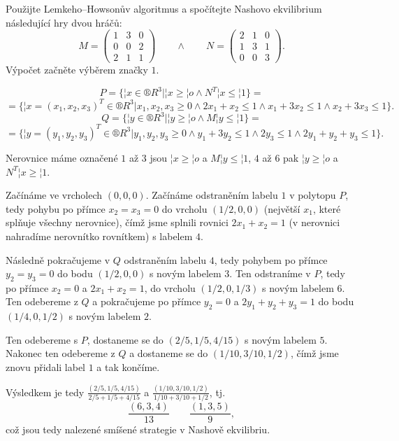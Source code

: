 \documentclass[12pt]{article}					%
\begin{document}
\begin{priklad}[2.2]
	Použijte Lemkeho–Howsonův algoritmus a spočítejte Nashovo ekvilibrium následující hry dvou hráčů:
	$$ M = \begin{pmatrix} 1 & 3 & 0 \\ 0 & 0 & 2 \\ 2 & 1 & 1 \end{pmatrix} \qquad \land \qquad N = \begin{pmatrix} 2 & 1 & 0 \\ 1 & 3 & 1 \\ 0 & 0 & 3 \end{pmatrix}. $$
	Výpočet začněte výběrem značky $1$.

	\begin{reseni}
		$$ P = \{¦x \in ®R^3 | ¦x ≥ ¦o \land N^T ¦x ≤ ¦1\} = $$
		$$ = \{¦x = (x_1, x_2, x_3)^T \in ®R^3 | x_1,x_2,x_3 ≥ 0 \land 2x_1 + x_2 ≤ 1 \land x_1 + 3x_2 ≤ 1 \land x_2 + 3x_3 ≤ 1\}. $$
		$$ Q = \{¦y \in ®R^3 | ¦y ≥ ¦o \land M ¦y ≤ ¦1\} = $$
		$$ = \{¦y = (y_1, y_2, y_3)^T \in ®R^3 | y_1,y_2,y_3 ≥ 0 \land y_1 + 3y_2 ≤ 1 \land 2y_3 ≤ 1 \land 2y_1 + y_2 + y_3 ≤ 1\}. $$

		Nerovnice máme označené $1$ až $3$ jsou $¦x ≥ ¦o$ a $M¦y ≤ ¦1$, $4$ až $6$ pak $¦y ≥ ¦o$ a $N^T¦x ≥ ¦1$.

		Začínáme ve vrcholech $(0, 0, 0)$. Začínáme odstraněním labelu $1$ v polytopu $P$, tedy pohybu po přímce $x_2 = x_3 = 0$ do vrcholu $(1 / 2, 0, 0)$ (největší $x_1$, které splňuje všechny nerovnice), čímž jsme splnili rovnici $2x_1 + x_2 = 1$ (v nerovnici nahradíme nerovnítko rovnítkem) s labelem $4$.

		Následně pokračujeme v $Q$ odstraněním labelu $4$, tedy pohybem po přímce $y_2 = y_3 = 0$ do bodu $(1 / 2, 0, 0)$ s novým labelem $3$. Ten odstraníme v $P$, tedy po přímce $x_2=0$ a $2x_1 + x_2 = 1$, do vrcholu $(1 / 2, 0, 1 / 3)$ s novým labelem $6$. Ten odebereme z $Q$ a pokračujeme po přímce $y_2 = 0$ a $2y_1 + y_2 + y_3 = 1$ do bodu $(1 / 4, 0, 1 / 2)$ s novým labelem $2$.

		Ten odebereme s $P$, dostaneme se do $(2 / 5, 1 / 5, 4 / 15)$ s novým labelem $5$. Nakonec ten odebereme z $Q$ a dostaneme se do $(1 / 10, 3 / 10, 1 / 2)$, čímž jsme znovu přidali label $1$ a tak končíme.

		Výsledkem je tedy $\frac{(2 / 5, 1 / 5, 4 / 15)}{2 / 5 + 1 / 5 + 4 / 15}$ a $\frac{(1 / 10, 3 / 10, 1 / 2)}{1 / 10 + 3 / 10 + 1 / 2}$, tj.
		$$ \frac{(6, 3, 4)}{13} \qquad \frac{(1, 3, 5)}{9}, $$
		což jsou tedy nalezené smíšené strategie v Nashově ekvilibriu.
	\end{reseni}
\end{priklad}
\end{document}
